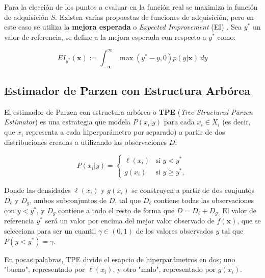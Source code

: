Para la elección de los puntos a evaluar en la función real se maximiza la función de adquisición $S$. Existen varias propuestas de funciones de adquisición, pero en este caso se utiliza la \textbf{mejora esperada} o \textit{Expected Improvement} (EI) \cite{EI1}. Sea $y^*$ un valor de referencia, se define a la mejora esperada  con respecto a $y^*$ como:


\begin{equation}
\label{eq:ei_def}
EI_{y^*}(\textbf{x}) := \int_{-\infty}^{\infty} \max(y^*-y,0) p(y|\textbf{x}) \ dy
\end{equation}
 

\subsection{Estimador de Parzen con Estructura Arbórea} 
\label{sec:TPE}

 El estimador de Parzen con estructura arbórea o \textbf{TPE} (\textit{Tree-Structured Parzen Estimator}) \cite{NIPS2011_86e8f7ab} es una estrategia que modela $P(x_i|y)$ para cada $x_i \in X_i$ (es decir, que $x_i$ representa a cada hiperparámetro por separado) a partir de dos distribuciones creadas a utilizando las observaciones $D$:

\begin{equation}
\label{eq:tpe}
P(x_i|y) =
	\begin{cases}
		\ell (x_i) & \text{si } y <y^{*} \\
		g(x_i) & \text{si } y \geq y^{*},
	\end{cases}
\end{equation}


Donde las densidades $\ell(x_i)$ y $g(x_i)$ se construyen a partir de dos conjuntos $D_{\ell}$ y $D_g$, ambos subconjuntos de $D$, tal que $D_{\ell}$ contiene todas las observaciones con $y < y^*$, y $D_g$ contiene a todo el resto de forma que $D = D_{\ell} + D_g$. El valor de referencia $y^{*}$ será un valor por encima del mejor valor observado de $f(\textbf{x})$, que se selecciona para ser un cuantil $\gamma \in (0,1)$ de los valores observados $y$ tal que $P(y<y^{*}) = \gamma$.

En pocas palabras, TPE divide el esapcio de hiperparámetros en dos; uno "bueno", representado por $\ell (x_i)$, y otro "malo", representado por $g (x_i)$.

